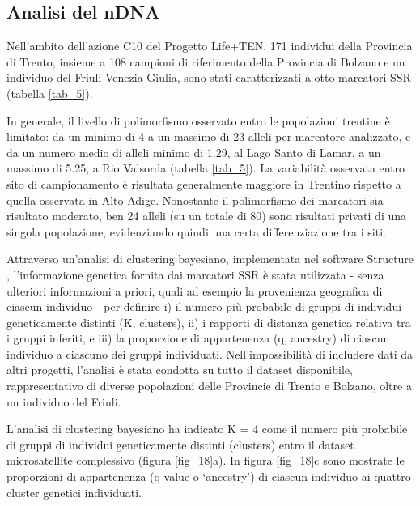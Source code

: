 \documentclass[11pt,a4paper,italian,twoside,openany]{memoir}
\begin{document}
\subsection{Analisi del nDNA}
Nell'ambito dell'azione C10 del Progetto Life+TEN, 171 individui della Provincia di Trento, insieme a 108 campioni di riferimento della Provincia di Bolzano e un individuo del Friuli Venezia Giulia, sono stati caratterizzati a otto marcatori SSR (tabella \ref{tab_5}).

In generale, il livello di polimorfismo osservato entro le popolazioni trentine è limitato: da un minimo di 4 a un massimo di 23 alleli per marcatore analizzato, e da un numero medio di alleli minimo di 1.29, al Lago Santo di Lamar, a un massimo di 5.25, a Rio Valsorda (tabella \ref{tab_5}). La variabilità osservata entro sito di campionamento è risultata generalmente maggiore in Trentino rispetto a quella osservata in Alto Adige. Nonostante il polimorfismo dei marcatori sia risultato moderato, ben 24 alleli (su un totale di 80) sono risultati privati di una singola popolazione, evidenziando quindi una certa differenziazione tra i siti.

Attraverso un'analisi di clustering bayesiano, implementata nel software Structure \cite{Pritchard 2001}, l'informazione genetica fornita dai marcatori SSR è stata utilizzata - senza ulteriori informazioni a priori, quali ad esempio la provenienza geografica di ciascun individuo - per definire i) il numero più probabile di gruppi di individui geneticamente distinti (K, clusters), ii) i rapporti di distanza genetica relativa tra i gruppi inferiti, e iii) la proporzione di appartenenza (q, ancestry) di ciascun individuo a ciascuno dei gruppi individuati. Nell'impossibilità di includere dati da altri progetti, l'analisi è stata condotta su tutto il dataset disponibile, rappresentativo di diverse popolazioni delle Provincie di Trento e Bolzano, oltre a un individuo del Friuli.

L'analisi di clustering bayesiano ha indicato K = 4 come il numero più probabile di gruppi di individui geneticamente distinti (clusters) entro il dataset microsatellite complessivo (figura \ref{fig_18}a). In figura \ref{fig_18}c sono mostrate le proporzioni di appartenenza (q value o ‘ancestry') di ciascun individuo ai quattro cluster genetici individuati. 
\end{document}
